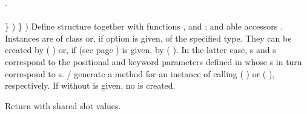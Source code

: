 \begin{LIST}{1cm}
{{{{          
        }{.}\\
        \\
      }{\}}%
      )%
    }{\}}
    )}
  {
    Define structure  together with functions
    ,  and
    ; and able accessors
    \LIT{-}. Instances are of class  or, if
     option  is given, of the specified type.
    They can be
    created by ( ) or, if  (see
    page \pageref{section:Functions}) is given, by (
     ). In the latter
    case, s and \kwd{:}s correspond to the positional
    and keyword parameters defined in  whose
    s in turn correspond to s.
    / generate a
     method for an instance  of 
    calling (  ) or (
      ), respectively.
    If  without  is given, no 
    is created.
  }

  {
    Return  with shared slot values.
  }

\end{LIST}



